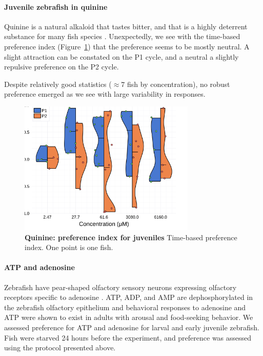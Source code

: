     \paragraph{Juvenile zebrafish in quinine} Quinine is a natural alkaloid that tastes bitter, and that is a highly deterrent substance for many fish species \cite{kasumyan2003taste}. Unexpectedly, we see with the time-based preference index (Figure~\ref{dist_quinine}) that the preference seems to be mostly neutral. A slight attraction can be constated on the P1 cycle, and a neutral a slightly repulsive preference on the P2 cycle.

Despite relatively good statistics ($\approx 7$ fish by concentration), no robust preference emerged as we see with large variability in responses.

    \begin{figure}[h!]
      \centering
      \includegraphics[width=0.75\textwidth]{part_2/assets/dist_quinine.png}
      \caption{\textbf{Quinine: preference index for juveniles} Time-based preference index. One point is one fish. }
      \label{dist_quinine}
    \end{figure}

  \paragraph{ATP and adenosine}
  Zebrafish have pear-shaped olfactory sensory neurons expressing olfactory receptors specific to adenosine \cite{wakisaka2017adenosine}. ATP, ADP, and AMP are dephosphorylated in the zebrafish olfactory epithelium \cite{wakisaka2017adenosine} and behavioral responses to adenosine and ATP were shown to exist in adults with arousal and food-seeking behavior. We assessed preference for ATP and adenosine for larval and early juvenile zebrafish. Fish were starved 24 hours before the experiment, and preference was assessed using the protocol presented above.

